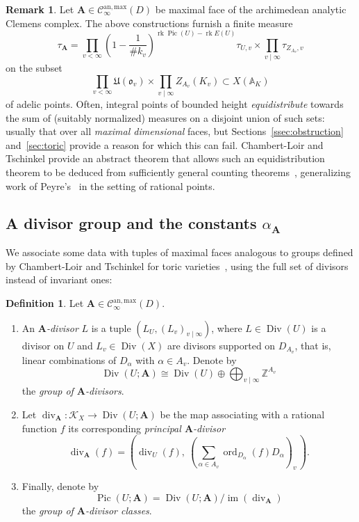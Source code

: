 \documentclass[a4paper, twoside, 10pt]{amsart}
\newcommand{\uA}{{\boldsymbol{A}}}
\newcommand{\cC}{\mathcal{C}}
\newcommand{\cK}{\mathcal{K}}
\newcommand{\mU}{\mathfrak{U}}
\newcommand{\fo}{\mathfrak{o}}
\newcommand{\bAA}{\mathbb{A}}
\newcommand{\ZZ}{\mathbb{Z}}
\newcommand{\Canmax}{\cC^{\mathrm{an,max}}}
\DeclareMathOperator{\Div}{Div}
\DeclareMathOperator{\sdiv}{div}
\DeclareMathOperator{\im}{im}
\DeclareMathOperator{\ord}{ord}
\DeclareMathOperator{\Pic}{Pic}
\DeclareMathOperator{\rk}{rk}
\theoremstyle{definition}
\newtheorem{definition}[theorem]{Definition}
\newtheorem{remark}[theorem]{Remark}
\begin{document}
\begin{remark}
  Let $\uA \in \Canmax_\infty(D)$ be maximal face of the archimedean analytic Clemens complex.
  The above constructions furnish a finite measure
  \[
    \tau_\uA = 
    \prod_{v < \infty} \left(1-\frac{1}{\#k_v}\right)^{\rk\Pic(U)-\rk E(U)} \tau_{U,v}
    \times \prod_{v \mid \infty} \tau_{Z_{A_v},v} 
  \]
  on the subset
  \[
    \prod _{v<\infty} \mU(\fo_v) \times \prod_{v\mid\infty}Z_{A_v}(K_v) \subset X(\bAA_K)
  \]
  of adelic points. Often, integral points of bounded height \emph{equidistribute} towards the sum of (suitably normalized) measures on a disjoint union of such sets: usually that over all \emph{maximal dimensional} faces, but Sections~\ref{ssec:obstruction} and~\ref{sec:toric} provide a reason for which this can fail. Chambert-Loir and Tschinkel provide an abstract theorem that allows such an equidistribution theorem to be deduced from sufficiently general counting theorems~\cite[Prop.~2.10]{MR2740045}, generalizing work of Peyre's~\cite[Prop.~5.4]{MR2019019} in the setting of rational points.
\end{remark}


\subsection{A divisor group and the constants \texorpdfstring{$\alpha_\uA$}{alpha A}}\label{ssec:divisor-group}

We associate some data with tuples of maximal faces analogous to groups defined by Chambert-Loir and Tschinkel for toric varieties~\cite[\S\,3.5]{arXiv:1006.3345}, using the full set of divisors instead of invariant ones:

\begin{definition}
  Let $\uA\in\Canmax_\infty(D)$.
  \begin{enumerate}
    \item An \emph{$\uA$-divisor} $L$ is a tuple $(L_U, (L_v)_{v\mid\infty})$, where $L\in \Div(U)$ is a divisor on $U$ and $L_v \in \Div(X)$ are divisors supported on $D_{A_v}$, that is, linear combinations of $D_\alpha$ with $\alpha\in A_v$. Denote by 
    \[
    \Div(U;\uA)\cong\Div(U) \oplus \bigoplus_{v\mid\infty} \ZZ^{A_v}
    \]
    the \emph{group of $\uA$-divisors}.

    \item Let  $\sdiv_\uA\colon \cK_X \to \Div(U;\uA)$ be the map associating with a rational function $f$ its corresponding \emph{principal $\uA$-divisor}
    \[
      \sdiv_\uA(f) = \left(\sdiv_U(f),\ \left(\sum_{\alpha\in A_v} \ord_{D_\alpha}(f) D_\alpha\right)_v \, \right).
    \]
    \item Finally, denote by
    \[
        \Pic(U;\uA)=\Div(U;\uA)/\im(\sdiv_\uA)
    \]
    the \emph{group of $\uA$-divisor classes}.
  \end{enumerate}
\end{definition}
\end{document}

